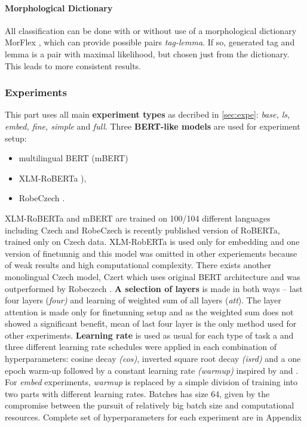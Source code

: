 

\paragraph{Morphological Dictionary} All classification can be done with or without use of a morphological dictionary MorFlex \citep{11234/1-1834}, which can provide possible pairs \textit{tag-lemma}. If so, generated tag and lemma is a pair with maximal likelihood, but chosen just from the dictionary. This leads to more consistent results. 


\subsubsection{Experiments}
This part uses all main \textbf{experiment types} as decribed in \ref{sec:expe}: \textit{base, ls, embed, fine, simple} and \textit{full}. Three \textbf{BERT-like models} are used for experiment setup:
\begin{itemize}
\item multilingual BERT (mBERT) \citep{Devlin2019} 
\item XLM-RoBERTa \citep{Conneau2019}), 
\item RobeCzech \citep{Straka2021}.
\end{itemize}
XLM-RoBERTa and mBERT are trained on 100/104 different languages including Czech and RobeCzech is recently published version of RoBERTa, trained only on Czech data. XLM-RobERTa is used only for embedding and one version of finetunnig and this model was omitted in other experiements because of weak results and high computational complexity. There exists another monolingual Czech model, Czert \citep{Sido2021} which uses original BERT architecture and was outperformed by Robeczech \citep{Straka2021}.
\textbf{A selection of layers} is made in both ways -- last four layers (\textit{four)} and learning of weighted sum of all layers (\textit{att}). The layer attention is made only for finetunning setup and as the weighted sum does not showed a significant benefit, mean of last four layer is the only method used for other experiments.
 \textbf{Learning rate} is used as usual for each type of task a and three different learning rate schedules were applied in each combination of hyperparameters: cosine decay \textit{(cos)}, inverted square root decay \textit{(isrd)} and a one epoch warm-up followed by a constant learning rate \textit{(warmup)} inspired by \citep{Kondratyuk2019} and \citep{Ruder2018}. For \textit{embed} experiments, \textit{warmup} is replaced by  a simple division of training into two parts with different learning rates.
Batches has size 64, given by the compromise between the pursuit of relatively big batch size and computational resources. Complete set of hyperparameters for each experiment are in Appendix %

